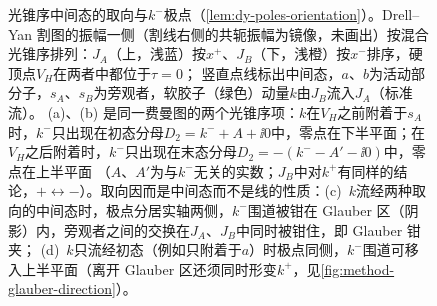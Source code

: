 \begin{figure}[htbp]
\caption{光锥序中间态的取向与$k^-$极点（\cref{lem:dy-poles-orientation}）。Drell--Yan 割图的振幅一侧（割线右侧的共轭振幅为镜像，未画出）按混合光锥序排列：$J_A$（上，浅蓝）按$x^+$、$J_B$（下，浅橙）按$x^-$排序，硬顶点$V_H$在两者中都位于$\tau=0$；
竖直点线标出中间态，$a$、$b$为活动部分子，$s_A$、$s_B$为旁观者，软胶子（绿色）动量$k$由$J_B$流入$J_A$（标准流）。
(a)、(b) 是同一费曼图的两个光锥序项：$k$在$V_H$之前附着于$s_A$时，$k^-$只出现在初态分母$D_2=k^-+A+\ii0$中，零点在下半平面；在$V_H$之后附着时，$k^-$只出现在末态分母$D_2=-(k^--A'-\ii0)$中，零点在上半平面
（$A$、$A'$为与$k^-$无关的实数；$J_B$中对$k^+$有同样的结论，$+\leftrightarrow-$）。取向因而是中间态而不是线的性质：(c)~$k$流经两种取向的中间态时，极点分居实轴两侧，$k^-$围道被钳在 Glauber 区（阴影）内，旁观者之间的交换在$J_A$、$J_B$中同时被钳住，即 Glauber 钳夹；
(d)~$k$只流经初态（例如只附着于$a$）时极点同侧，$k^-$围道可移入上半平面（离开 Glauber 区还须同时形变$k^+$，见\cref{fig:method-glauber-direction}）。}
\label{fig:dy-pole-orientation}
\end{figure}

